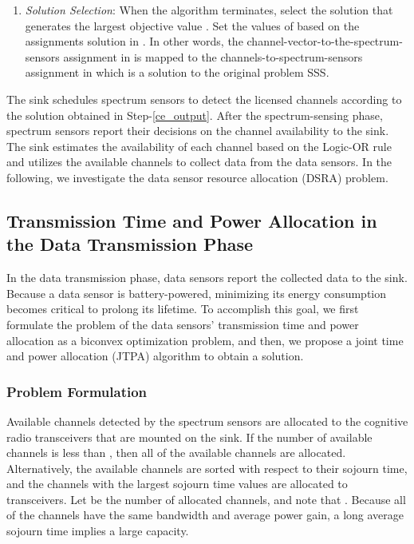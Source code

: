 \documentclass[journal]{IEEEtran} \ifCLASSINFOpdf
\begin{document}
\begin{enumerate}[]
{then

}. Otherwise, increment the iteration counter  and go back to Step \ref{ce_gs}. Eqn. (\ref{eqn_threshold}) represents the convergence condition of p.m.f . It was shown in \cite{Costa2007} that the sequence of p.m.f converges with probability 1 to a unit mass that is located at one of the samples.

Note that fine tuning the values  and  impacts the convergence speed of the algorithm and the quality of the obtained solution. A large value of  results in faster convergence but a shorter average available time of the channel. Additionally, a larger value for  leads to a slower convergence speed but also leads to a longer average available time for the channel.
\item \textit{Solution Selection}: When the algorithm terminates, select the solution  that generates the largest objective value . Set the values of  based on the assignments solution in . In other words, the channel-vector-to-the-spectrum-sensors assignment in  is mapped to the channels-to-spectrum-sensors assignment in  which is a solution to the original problem SSS.
    \label{ce_output}
\end{enumerate}

The sink schedules spectrum sensors to detect the licensed channels according to the solution obtained in Step-\ref{ce_output}. After the spectrum-sensing phase, spectrum sensors report their decisions on the channel availability to the sink. The sink estimates the availability of each channel based on the Logic-OR rule and utilizes the available channels to collect data from the data sensors. In the following, we investigate the data sensor resource allocation (DSRA) problem.

\subsection{Transmission Time and Power Allocation in the Data Transmission Phase}
\label{sec:data_transmission}
In the data transmission phase, data sensors report the collected data to the sink. Because a data sensor is battery-powered, minimizing its energy consumption becomes critical to prolong its lifetime. To accomplish this goal, we first formulate the problem of the data sensors' transmission time and power allocation as a biconvex optimization problem, and then, we propose a joint time and power allocation (JTPA) algorithm to obtain a solution.
\subsubsection{Problem Formulation}
Available channels detected by the spectrum sensors are allocated to the  cognitive radio transceivers that are mounted on the sink. If the number of available channels is less than , then all of the available channels are allocated. Alternatively, the available channels are sorted with respect to their sojourn time, and the channels with the largest sojourn time values are allocated to transceivers. Let  be the number of allocated channels, and note that . Because all of the channels have the same bandwidth and average power gain, a long average sojourn time implies a large capacity.
\end{document}
